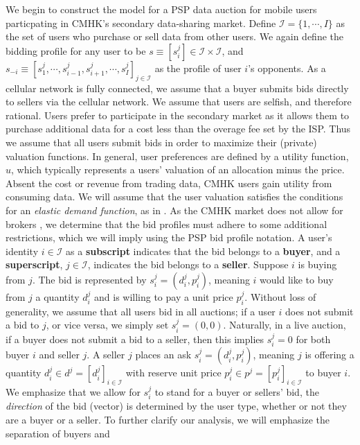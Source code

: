 \documentclass[12pt]{article}
\theoremstyle{definition}
\newcommand{\mcI}{\mathcal{I}}
\begin{document}
\begin{multicols}{2}
We begin to construct the model for a PSP data auction for  mobile users
particpating in CMHK's secondary data-sharing market.
Define $\mcI = \lbrace 1, \cdots, I\rbrace$ as the set of users who purchase or sell
data from other users. We again define the bidding profile for any user to be 
$s \equiv
[s_i^j] \in \mcI \times \mcI$, and $s_{-i} \equiv [s_1^j , \cdots , s_{i-1}^j , s_{i+1}^j , \cdots
, s_I^j]_{j\in\mcI}$ as the profile of user $i$'s opponents. 
As a cellular network is fully connected, we assume that a buyer submits bids directly to sellers via the
cellular network. We assume that users are selfish, and therefore
rational. 
 Users prefer to participate in the secondary market as it allows them to purchase
additional data for a cost less than the overage fee set by the ISP. 
Thus we assume that all users submit bids in order to maximize their
(private) valuation functions. 
In general, user preferences are defined by a utility function, $u$, which typically
represents a users' valuation of an allocation minus the price.
Absent the cost or revenue from trading data, CMHK users gain utility from consuming
data. 
We will assume that the user valuation satisfies the conditions for an
\emph{elastic demand function}, as in \cite{lazar}. 
As the CMHK market does not allow for brokers \cite{cmhk}, we determine that
the bid profiles must adhere to some additional restrictions, which we will
imply using the PSP bid profile notation.
A user's identity $i \in \mcI$ as a \textbf{subscript} indicates that the bid
belongs to a \textbf{buyer}, and a \textbf{superscript}, $j\in\mcI$, indicates
the bid belongs to a \textbf{seller}.
Suppose $i$ is buying from $j$. The bid is represented by $s_i^j = (d_i^j, p_i^j)$, 
meaning $i$ would like to buy from $j$ a quantity $d^j_i$ and is willing to pay
a unit price $p^j_i$. Without loss of generality, we assume that all users bid in all
auctions; if a user $i$ does not submit a bid to $j$, or vice versa, we simply set $s_i^j =
(0,0)$. Naturally, in a live auction, if a buyer does
not submit a bid to a seller, then this implies $s_i^j = 0$ for both buyer $i$
and seller $j$.
A seller $j$ places an ask $s_i^j = (d_i^j, p_i^j)$, meaning $j$ is offering a
quantity $d_i^j \in d^j = [d_i^j]_{i\in\mcI}$ 
with reserve unit price $p_i^j \in p^j = [p_i^j]_{i\in\mcI}$ to buyer $i$. We emphasize that we allow for $s_i^j$ to
stand for a buyer or sellers' bid, the \emph{direction} of the bid (vector) is determined
by the user type, whether or not they are  a buyer or a seller. 
To further clarify our analysis, we will emphasize the separation of buyers and

\end{multicols}
\end{document}
